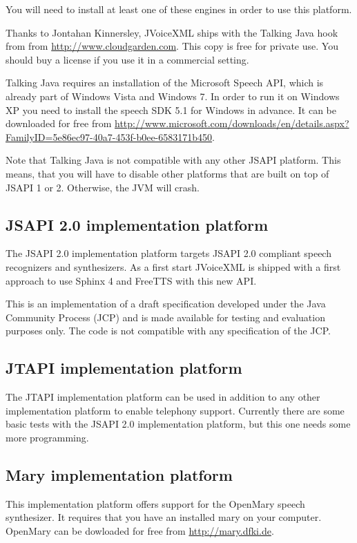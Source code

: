 \documentclass[11pt,a4paper]{article}
\begin{document}
You will need to install at least one of these engines in order to use this
platform.

Thanks to Jontahan Kinnersley, JVoiceXML ships with the Talking Java hook from
from \url{http://www.cloudgarden.com}. This copy is free for
private use. You should buy a license if you use it in a commercial setting.

Talking Java requires an installation of the Microsoft Speech API, which is
already part of Windows Vista and Windows 7. In order to run it on Windows XP
you need to install the speech SDK 5.1 for Windows in advance. It can be
downloaded for free from
\url{http://www.microsoft.com/downloads/en/details.aspx?FamilyID=5e86ec97-40a7-453f-b0ee-6583171b450}.

Note that Talking Java is not compatible with any other JSAPI platform. This
means, that you will have to disable other platforms that are built on top of
JSAPI 1 or 2. Otherwise, the JVM will crash.

\subsection{JSAPI 2.0 implementation platform}

The JSAPI 2.0 implementation platform targets JSAPI 2.0 compliant speech
recognizers and synthesizers. As a first start JVoiceXML is shipped with a
first approach to use Sphinx 4 and FreeTTS with this new API.

This is an implementation of a draft specification developed under the Java
Community Process (JCP) and is made available for testing and evaluation
purposes only. The code is not compatible with any specification of the JCP.


\subsection{JTAPI implementation platform}

The JTAPI implementation platform can be used in addition to any other
implementation platform to enable telephony support. Currently there are some
basic tests with the JSAPI 2.0 implementation platform, but this one needs some
more programming.

\subsection{Mary implementation platform}

This implementation platform offers support for the OpenMary speech synthesizer. 
It requires that you have an installed mary on your computer. OpenMary can be
dowloaded for free from \url{http://mary.dfki.de}.
\end{document}
